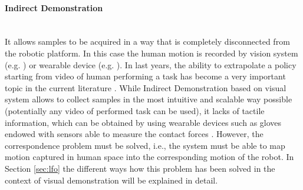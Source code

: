 \paragraph{Indirect Demonstration}  \mbox{} \\ 
It allows samples to be acquired in a way that is completely disconnected from the robotic platform. In this case the human motion is recorded by vision system (e.g. \cite{smith2019avid,sermanet2018time_contrastive}) or wearable device (e.g. \cite{liu2019_mirroring_without_overimitation}). In last years, the ability to extrapolate a policy starting from video of human performing a task has become a very important topic in the current literature \cite{fang2019survey,torabi2019recent_advances_lfo}. While Indirect Demonstration based on visual system allows to collect samples in the most intuitive and scalable way possible (potentially any video of performed task can be used), it lacks of tactile information, which can be obtained by using wearable devices such as gloves endowed with sensors able to measure the contact forces \cite{liu2017glove_force}. However, the correspondence problem must be solved, i.e., the system must be able to map motion captured in human space into the corresponding motion of the robot. In Section \ref{sec:lfo} the different ways how this problem has been solved in the context of visual demonstration will be explained in detail.
